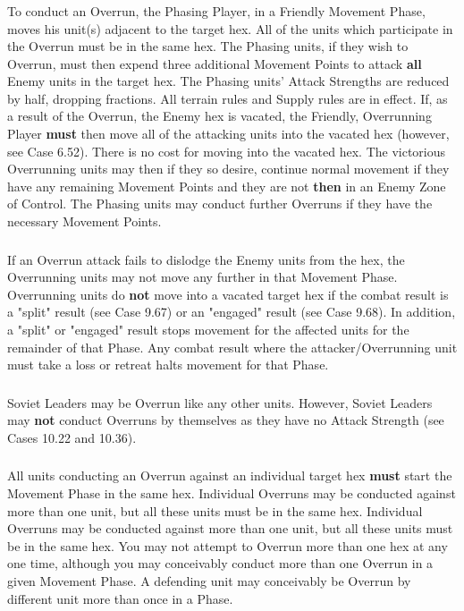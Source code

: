 \subsubsection{} To conduct an Overrun, the Phasing Player, in a Friendly Movement Phase, moves his unit(s) adjacent to the target hex. All of the units which participate in the Overrun must be in the same hex. The Phasing units, if they wish to Overrun, must then expend three additional Movement Points to attack \textbf{all} Enemy units in the target hex. The Phasing units' Attack Strengths are reduced by half, dropping fractions. All terrain rules and Supply rules are in effect. If, as a result of the Overrun, the Enemy hex is vacated, the Friendly, Overrunning Player \textbf{must} then move all of the attacking units into the vacated hex (however, see Case 6.52). There is no cost for moving into the vacated hex. The victorious Overrunning units may then if they so desire, continue normal movement if they have any remaining Movement Points and they are not \textbf{then} in an Enemy Zone of Control. The Phasing units may conduct further Overruns if they have the necessary Movement Points.

\subsubsection{} If an Overrun attack fails to dislodge the Enemy units from the hex, the Overrunning units may not move any further in that Movement Phase. Overrunning units do \textbf{not} move into a vacated target hex if the combat result is a "split" result (see Case 9.67) or an "engaged" result (see Case 9.68). In addition, a "split" or "engaged" result stops movement for the affected units for the remainder of that Phase. Any combat result where the attacker/Overrunning unit must take a loss or retreat halts movement for that Phase.

\subsubsection{} Soviet Leaders may be Overrun like any other units. However, Soviet Leaders may \textbf{not} conduct Overruns by themselves as they have no Attack Strength (see Cases 10.22 and 10.36).

\subsubsection{} All units conducting an Overrun against an individual target hex \textbf{must} start the Movement Phase in the same hex. Individual Overruns may be conducted against more than one unit, but all these units must be in the same hex. Individual Overruns may be conducted against more than one unit, but all these units must be in the same hex. You may not attempt to Overrun more than one hex at any one time, although you may conceivably conduct more than one Overrun in a given Movement Phase. A defending unit may conceivably be Overrun by different unit more than once in a Phase.

